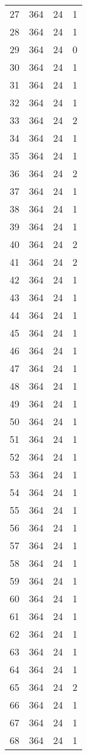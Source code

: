 \begin{longtable}[!]{c|ccc}
	27	& 364	& 24	& 1	\\
	28	& 364	& 24	& 1	\\
	29	& 364	& 24	& 0	\\
	30	& 364	& 24	& 1	\\
	31	& 364	& 24	& 1	\\
	32	& 364	& 24	& 1	\\
	33	& 364	& 24	& 2	\\
	34	& 364	& 24	& 1	\\
	35	& 364	& 24	& 1	\\
	36	& 364	& 24	& 2	\\
	37	& 364	& 24	& 1	\\
	38	& 364	& 24	& 1	\\
	39	& 364	& 24	& 1	\\
	40	& 364	& 24	& 2	\\
	41	& 364	& 24	& 2	\\
	42	& 364	& 24	& 1	\\
	43	& 364	& 24	& 1	\\
	44	& 364	& 24	& 1	\\
	45	& 364	& 24	& 1	\\
	46	& 364	& 24	& 1	\\
	47	& 364	& 24	& 1	\\
	48	& 364	& 24	& 1	\\
	49	& 364	& 24	& 1	\\
	50	& 364	& 24	& 1	\\
	51	& 364	& 24	& 1	\\
	52	& 364	& 24	& 1	\\
	53	& 364	& 24	& 1	\\
	54	& 364	& 24	& 1	\\
	55	& 364	& 24	& 1	\\
	56	& 364	& 24	& 1	\\
	57	& 364	& 24	& 1	\\
	58	& 364	& 24	& 1	\\
	59	& 364	& 24	& 1	\\
	60	& 364	& 24	& 1	\\
	61	& 364	& 24	& 1	\\
	62	& 364	& 24	& 1	\\
	63	& 364	& 24	& 1	\\
	64	& 364	& 24	& 1	\\
	65	& 364	& 24	& 2	\\
	66	& 364	& 24	& 1	\\
	67	& 364	& 24	& 1	\\
	68	& 364	& 24	& 1	\\

\end{longtable}
